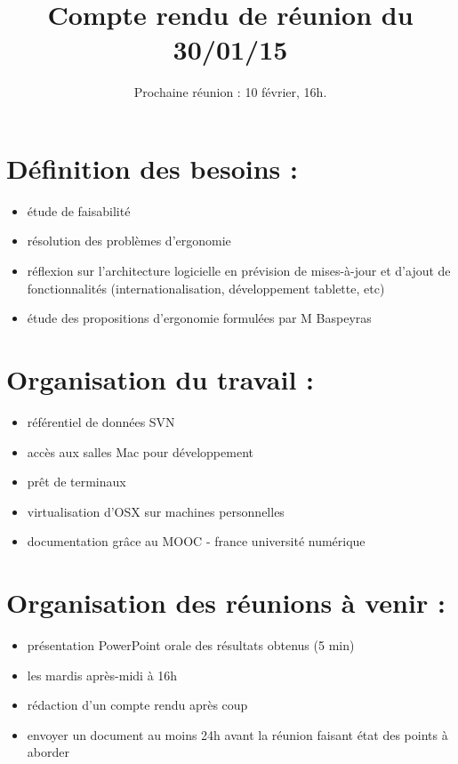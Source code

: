 \documentclass{scrartcl}
\begin{document}

\title{Compte rendu de réunion du 30/01/15}
\subtitle{Prochaine réunion : 10 février, 16h.\vspace{-5ex}}
\date{}
\maketitle

\section{Définition des besoins :}
\begin{itemize}
  \item étude de faisabilité
  \item résolution des problèmes d’ergonomie
  \item réflexion sur l’architecture logicielle en prévision de mises-à-jour et d’ajout de fonctionnalités (internationalisation, développement tablette, etc)
  \item étude des propositions d’ergonomie formulées par M Baspeyras
\end{itemize}


\section{Organisation du travail :}
\begin{itemize}
  \item référentiel de données SVN
  \item accès aux salles Mac pour développement
  \item prêt de terminaux
  \item virtualisation d’OSX sur machines personnelles
  \item documentation grâce au MOOC - france université numérique
\end{itemize}


\section{Organisation des réunions à venir :}
\begin{itemize}
  \item présentation PowerPoint orale des résultats obtenus (5 min)
  \item les mardis après-midi à 16h
  \item rédaction d’un compte rendu après coup
  \item envoyer un document au moins 24h avant la réunion faisant état des points à aborder
\end{itemize}
\end{document}
